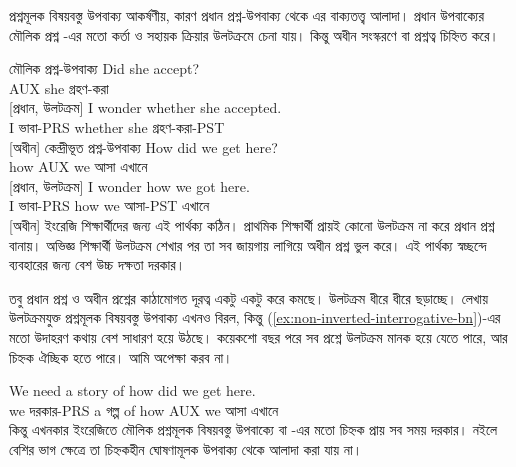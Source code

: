 \label{sec:sub-interrog-bn}

প্রশ্নমূলক বিষয়বস্তু উপবাক্য আকর্ষণীয়, কারণ প্রধান প্রশ্ন-উপবাক্য থেকে এর বাক্যতত্ত্ব আলাদা। প্রধান উপবাক্যের মৌলিক প্রশ্ন -এর মতো কর্তা ও সহায়ক ক্রিয়ার উলটক্রমে চেনা যায়। কিন্তু অধীন সংস্করণে  বা  প্রশ্নত্ব চিহ্নিত করে।

\ea মৌলিক প্রশ্ন-উপবাক্য\label{ex:int-sub-bn}
    \ea \gll Did she accept?\\
        AUX she গ্রহণ-করা\\
    \glt {} [প্রধান, উলটক্রম]
    \ex \gll I wonder {\ob}whether she accepted{\cb}.\\
        I ভাবা-PRS whether she গ্রহণ-করা-PST\\
    \glt {} [অধীন]
    \z
\z
\ea কেন্দ্রীভূত প্রশ্ন-উপবাক্য
    \ea \gll How did we get here?\\
        how AUX we আসা এখানে\\
    \glt {} [প্রধান, উলটক্রম]
    \ex \gll I wonder {\ob}how we got here{\cb}.\\
        I ভাবা-PRS how we আসা-PST এখানে\\
    \glt {} [অধীন]
    \z
\z
ইংরেজি শিক্ষার্থীদের জন্য এই পার্থক্য কঠিন। প্রাথমিক শিক্ষার্থী প্রায়ই কোনো উলটক্রম না করে প্রধান প্রশ্ন বানায়। অভিজ্ঞ শিক্ষার্থী উলটক্রম শেখার পর তা সব জায়গায় লাগিয়ে অধীন প্রশ্ন ভুল করে। এই পার্থক্য স্বচ্ছন্দে ব্যবহারের জন্য বেশ উচ্চ দক্ষতা দরকার।

তবু প্রধান প্রশ্ন ও অধীন প্রশ্নের কাঠামোগত দূরত্ব একটু একটু করে কমছে। উলটক্রম ধীরে ধীরে ছড়াচ্ছে। লেখায় উলটক্রমযুক্ত প্রশ্নমূলক বিষয়বস্তু উপবাক্য এখনও বিরল, কিন্তু (\ref{ex:non-inverted-interrogative-bn})-এর মতো উদাহরণ কথায় বেশ সাধারণ হয়ে উঠছে। কয়েকশো বছর পরে সব প্রশ্নে উলটক্রম মানক হয়ে যেতে পারে, আর চিহ্নক ঐচ্ছিক হতে পারে। আমি অপেক্ষা করব না।

\ea\label{ex:non-inverted-interrogative-bn}
\gll We need a story of {\ob}how did we get here{\cb}.\\
    we দরকার-PRS a গল্প of how AUX we আসা এখানে\\
\glt {}
\z
কিন্তু এখনকার ইংরেজিতে মৌলিক প্রশ্নমূলক বিষয়বস্তু উপবাক্যে  বা -এর মতো চিহ্নক প্রায় সব সময় দরকার। নইলে বেশির ভাগ ক্ষেত্রে তা চিহ্নকহীন ঘোষণামূলক উপবাক্য থেকে আলাদা করা যায় না।

